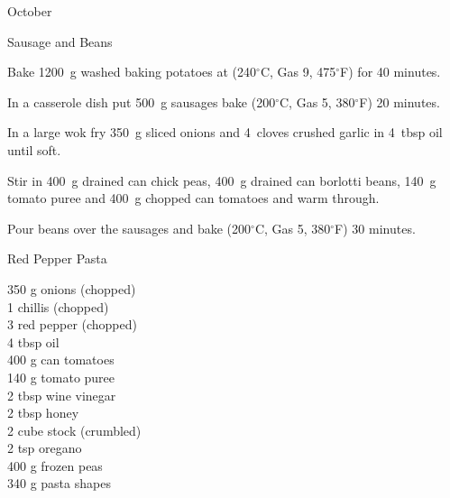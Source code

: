 \begin{menu}{October}
\begin{recipe}{2}{Sausage and Beans}
\begin{ingredients}
		\end{ingredients}
	
	
    \begin{instructions}
    \item 
    Bake
    1200~g washed baking potatoes
    at
    (240$^{\circ}$C, Gas 9, 475$^{\circ}$F) for 40 minutes.
  \item 
        In a casserole dish put
        500~g  sausages
        bake (200$^{\circ}$C, Gas 5, 380$^{\circ}$F) 20 minutes.
      \item 
        In a large wok fry
        350~g sliced onions
        and
        4~cloves crushed garlic
        in
        4~tbsp  oil
        until soft.
      \item 
        Stir in
        400~g drained can chick peas,
        400~g drained can borlotti beans,
        140~g  tomato puree
        and
        400~g chopped can tomatoes
        and warm through.
      \item 
        Pour beans over the sausages and bake (200$^{\circ}$C, Gas 5, 380$^{\circ}$F) 30 minutes.
      
    \end{instructions}
    \end{recipe}%
  
    \begin{recipe}{2}{Red Pepper Pasta}%
		\begin{ingredients}
		350 g onions (chopped) \\
	1  chillis (chopped) \\
	3  red pepper (chopped) \\
	4 tbsp oil  \\
	400 g can tomatoes  \\
	140 g tomato puree  \\
	2 tbsp wine vinegar  \\
	2 tbsp honey  \\
	2 cube stock (crumbled) \\
	2 tsp oregano  \\
	400 g frozen peas  \\
	340 g pasta shapes  \\
	
		\end{ingredients}
	
	

\end{recipe}
\end{menu}
